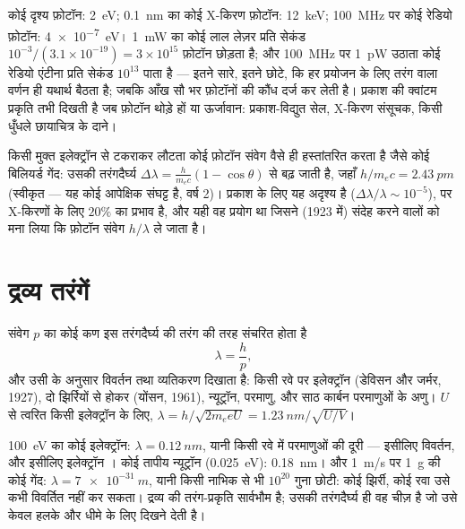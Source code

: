 \begin{example}[परिमाण की कोटियाँ]\label{ex:b1:quantum-introduction:orders}
कोई दृश्य फ़ोटॉन: \qty{2}{eV}; \qty{0.1}{nm} का कोई X-किरण फ़ोटॉन: \qty{12}{keV};
\qty{100}{MHz} पर कोई रेडियो फ़ोटॉन: \qty{4e-7}{eV}। \qty{1}{mW} का कोई लाल
लेज़र प्रति सेकंड $10^{-3}/(3.1 \times 10^{-19}) = 3 \times 10^{15}$ फ़ोटॉन
छोड़ता है; और \qty{100}{MHz} पर \qty{1}{pW} उठाता कोई रेडियो एंटीना प्रति
सेकंड $10^{13}$ पाता है --- इतने सारे, इतने छोटे, कि हर प्रयोजन के लिए तरंग
वाला वर्णन ही यथार्थ बैठता है; जबकि आँख सौ भर फ़ोटॉनों की कौंध दर्ज कर लेती
है। प्रकाश की क्वांटम प्रकृति तभी दिखती है जब फ़ोटॉन थोड़े हों या ऊर्जावान:
प्रकाश-विद्युत सेल, X-किरण संसूचक, किसी धुँधले छायाचित्र के दाने।
\end{example}

\begin{remark}[कॉम्पटन प्रकीर्णन]\label{rem:b1:quantum-introduction:compton}
किसी मुक्त इलेक्ट्रॉन से टकराकर लौटता कोई फ़ोटॉन संवेग वैसे ही हस्तांतरित
करता है जैसे कोई बिलियर्ड गेंद: उसकी तरंगदैर्घ्य $\Delta\lambda = \frac{h}{m_ec}(1 -
\cos\theta)$ से बढ़ जाती है, जहाँ $h/m_ec = \qty{2.43}{pm}$ (स्वीकृत --- यह
कोई आपेक्षिक संघट्ट है, वर्ष 2)। प्रकाश के लिए यह अदृश्य है ($\Delta\lambda/\lambda \sim 10^{-5}$),
पर X-किरणों के लिए $20\%$ का प्रभाव है, और यही वह प्रयोग था जिसने (1923 में)
संदेह करने वालों को मना लिया कि फ़ोटॉन संवेग $h/\lambda$ ले जाता है।
\end{remark}

\section{द्रव्य तरंगें}

\begin{theorem}[दे ब्रॉय]\label{thm:b1:quantum-introduction:debroglie}
संवेग $p$ का कोई कण इस तरंगदैर्घ्य की तरंग की तरह संचरित होता है
\[
\lambda = \frac{h}{p} ,
\]
और उसी के अनुसार विवर्तन तथा व्यतिकरण दिखाता है: किसी रवे पर इलेक्ट्रॉन
(डेविसन और जर्मर, 1927), दो झिर्रियों से होकर (योंसन, 1961), न्यूट्रॉन,
परमाणु, और साठ कार्बन परमाणुओं के अणु। $U$ से त्वरित किसी इलेक्ट्रॉन के लिए,
$\lambda = h/\sqrt{2m_eeU} = \qty{1.23}{nm}/\sqrt{U/\unit{V}}$।
\end{theorem}
\admitted

\begin{example}[यह हमें कभी दिखा क्यों नहीं]\label{ex:b1:quantum-introduction:wavelengths}
\qty{100}{eV} का कोई इलेक्ट्रॉन: $\lambda = \qty{0.12}{nm}$, यानी किसी रवे
में परमाणुओं की दूरी --- इसीलिए विवर्तन, और इसीलिए इलेक्ट्रॉन ।
कोई तापीय न्यूट्रॉन (\qty{0.025}{eV}): \qty{0.18}{nm}। और \qty{1}{m/s} पर
\qty{1}{g} की कोई गेंद: $\lambda = \qty{7e-31}{m}$, यानी किसी नाभिक से भी
$10^{20}$ गुना छोटी: कोई झिर्री, कोई रवा उसे कभी विवर्तित नहीं कर सकता।
द्रव्य की तरंग-प्रकृति सार्वभौम है; उसकी तरंगदैर्घ्य ही वह चीज़ है जो उसे
केवल हलके और धीमे के लिए दिखने देती है।
\end{example}

